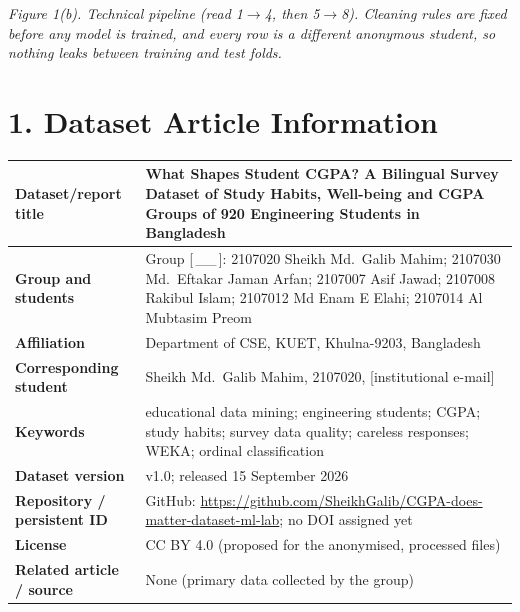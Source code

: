 \documentclass[11pt,a4paper]{article}
\newcommand{\hd}[1]{\textbf{#1}}
\begin{document}
\vspace{-5mm}
\begin{center}

\end{center}
\vspace{-4mm}
{\small\itshape Figure 1(b). Technical pipeline (read 1$\rightarrow$4, then 5$\rightarrow$8). Cleaning rules are fixed before any model is trained, and every row is a different anonymous student, so nothing leaks between training and test folds.}

\newpage
\section{1. Dataset Article Information}
{\small
\begin{tabularx}{\linewidth}{L{42mm}Y}
\hline
\hd{Dataset/report title} & What Shapes Student CGPA? A Bilingual Survey Dataset of Study Habits, Well-being and CGPA Groups of 920 Engineering Students in Bangladesh \\ \hline
\hd{Group and students} & Group [\,\_\_\,]: 2107020 Sheikh Md.\ Galib Mahim; 2107030 Md.\ Eftakar Jaman Arfan; 2107007 Asif Jawad; 2107008 Rakibul Islam; 2107012 Md Enam E Elahi; 2107014 Al Mubtasim Preom \\ \hline
\hd{Affiliation} & Department of CSE, KUET, Khulna-9203, Bangladesh \\ \hline
\hd{Corresponding student} & Sheikh Md.\ Galib Mahim, 2107020, [institutional e-mail] \\ \hline
\hd{Keywords} & educational data mining; engineering students; CGPA; study habits; survey data quality; careless responses; WEKA; ordinal classification \\ \hline
\hd{Dataset version} & v1.0; released 15 September 2026 \\ \hline
\hd{Repository / persistent ID} & GitHub: \url{https://github.com/SheikhGalib/CGPA-does-matter-dataset-ml-lab}; no DOI assigned yet \\ \hline
\hd{License} & CC BY 4.0 (proposed for the anonymised, processed files) \\ \hline
\hd{Related article / source} & None (primary data collected by the group) \\ \hline
\end{tabularx}}

\end{document}
